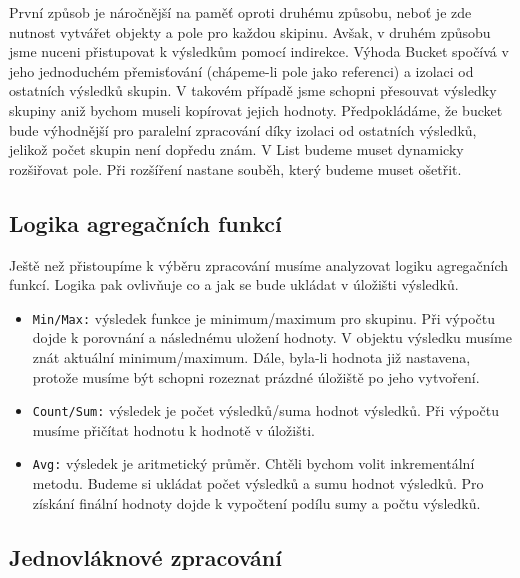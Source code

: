 První způsob je náročnější na paměť oproti druhému způsobu, neboť je zde nutnost vytvářet objekty a pole pro každou skipinu.
Avšak, v druhém způsobu jsme nuceni přistupovat k výsledkům pomocí indirekce.
Výhoda Bucket spočívá v jeho jednoduchém přemisťování (chápeme-li pole jako referenci) a izolaci od ostatních výsledků skupin.
V takovém případě jsme schopni přesouvat výsledky skupiny aniž bychom museli kopírovat jejich hodnoty.
Předpokládáme, že bucket bude výhodnější pro paralelní zpracování díky izolaci od ostatních výsledků, jelikož počet skupin není dopředu znám.
V List budeme muset dynamicky rozšiřovat pole.
Při rozšíření nastane souběh, který budeme muset ošetřit.

\subsection{Logika agregačních funkcí}

Ještě než přistoupíme k výběru zpracování musíme analyzovat logiku agregačních funkcí.
Logika pak ovlivňuje co a jak se bude ukládat v úložišti výsledků.

\begin{itemize}
\item \texttt{Min/Max:} výsledek funkce je minimum/maximum pro skupinu. Při výpočtu dojde k porovnání a následnému uložení hodnoty.
V objektu výsledku musíme znát aktuální minimum/maximum.
Dále, byla-li hodnota již nastavena, protože musíme být schopni rozeznat prázdné úložiště po jeho vytvoření.


\item \texttt{Count/Sum:} výsledek je počet výsledků/suma hodnot výsledků. Při výpočtu musíme přičítat hodnotu k hodnotě v úložišti.
\item \texttt{Avg:} výsledek je aritmetický průměr. Chtěli bychom volit inkrementální metodu. Budeme si ukládat počet výsledků a sumu hodnot výsledků. Pro získání finální hodnoty dojde k vypočtení podílu sumy a počtu výsledků.
\end{itemize}

\subsection{Jednovláknové zpracování} \label{anal.groupby.singlethread}


